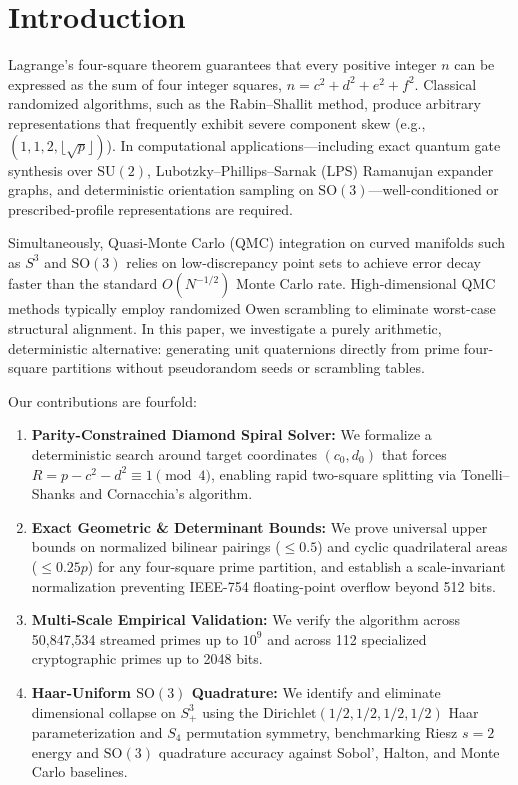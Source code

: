 \documentclass[conference]{IEEEtran}
\begin{document}
\section{Introduction}
Lagrange's four-square theorem guarantees that every positive integer $n$ can be expressed as the sum of four integer squares, $n = c^2 + d^2 + e^2 + f^2$. Classical randomized algorithms, such as the Rabin--Shallit method, produce arbitrary representations that frequently exhibit severe component skew (e.g., $(1, 1, 2, \lfloor\sqrt{p}\rfloor)$). In computational applications---including exact quantum gate synthesis over $\mathrm{SU}(2)$, Lubotzky--Phillips--Sarnak (LPS) Ramanujan expander graphs, and deterministic orientation sampling on $\mathrm{SO}(3)$---well-conditioned or prescribed-profile representations are required.

Simultaneously, Quasi-Monte Carlo (QMC) integration on curved manifolds such as $S^3$ and $\mathrm{SO}(3)$ relies on low-discrepancy point sets to achieve error decay faster than the standard $O(N^{-1/2})$ Monte Carlo rate. High-dimensional QMC methods typically employ randomized Owen scrambling to eliminate worst-case structural alignment. In this paper, we investigate a purely arithmetic, deterministic alternative: generating unit quaternions directly from prime four-square partitions without pseudorandom seeds or scrambling tables.

Our contributions are fourfold:
\begin{enumerate}
    \item \textbf{Parity-Constrained Diamond Spiral Solver:} We formalize a deterministic search around target coordinates $(c_0, d_0)$ that forces $R = p - c^2 - d^2 \equiv 1 \pmod 4$, enabling rapid two-square splitting via Tonelli--Shanks and Cornacchia's algorithm.
    \item \textbf{Exact Geometric & Determinant Bounds:} We prove universal upper bounds on normalized bilinear pairings ($\le 0.5$) and cyclic quadrilateral areas ($\le 0.25p$) for any four-square prime partition, and establish a scale-invariant normalization preventing IEEE-754 floating-point overflow beyond 512 bits.
    \item \textbf{Multi-Scale Empirical Validation:} We verify the algorithm across 50,847,534 streamed primes up to $10^9$ and across 112 specialized cryptographic primes up to 2048 bits.
    \item \textbf{Haar-Uniform $\mathrm{SO}(3)$ Quadrature:} We identify and eliminate dimensional collapse on $S^3_+$ using the $\mathrm{Dirichlet}(1/2, 1/2, 1/2, 1/2)$ Haar parameterization and $S_4$ permutation symmetry, benchmarking Riesz $s=2$ energy and $\mathrm{SO}(3)$ quadrature accuracy against Sobol', Halton, and Monte Carlo baselines.
\end{enumerate}
\end{document}
